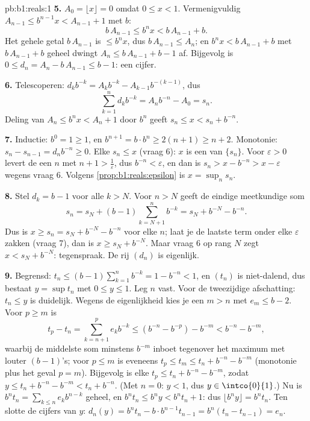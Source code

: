 \begin{solution}{pb:b1:reals:1}
\textbf{5.} $A_0 = \lfloor x \rfloor = 0$ omdat $0 \leq x < 1$.
Vermenigvuldig $A_{n-1} \leq b^{n-1} x < A_{n-1} + 1$ met $b$:
\[
b\,A_{n-1} \leq b^n x < b\,A_{n-1} + b .
\]
Het gehele getal $b\,A_{n-1}$ is $\leq b^n x$, dus $b\,A_{n-1} \leq A_n$;
en $b^n x < b\,A_{n-1} + b$ met $b\,A_{n-1} + b$ geheel dwingt $A_n \leq
b\,A_{n-1} + b - 1$ af. Bijgevolg is $0 \leq d_n = A_n - b\,A_{n-1} \leq
b - 1$: een cijfer.

\textbf{6.} Telescoperen: $d_k b^{-k} = A_k b^{-k} - A_{k-1}
b^{-(k-1)}$, dus
\[
\sum_{k=1}^n d_k b^{-k} = A_n b^{-n} - A_0 = s_n .
\]
Deling van $A_n \leq b^n x < A_n + 1$ door $b^n$ geeft $s_n \leq x < s_n
+ b^{-n}$.

\textbf{7.} Inductie: $b^0 = 1 \geq 1$, en $b^{n+1} = b \cdot b^n \geq
2(n + 1) \geq n + 2$. Monotonie: $s_n - s_{n-1} = d_n b^{-n} \geq 0$.
Elke $s_n \leq x$ (vraag 6): $x$ is een  van $\{s_n\}$. Voor
$\varepsilon > 0$ levert de  een $n$ met $n + 1 >
\frac1\varepsilon$, dus $b^{-n} < \varepsilon$, en dan is $s_n > x -
b^{-n} > x - \varepsilon$ wegens vraag 6. Volgens
\cref{prop:b1:reals:epsilon} is $x = \sup_n s_n$.

\textbf{8.} Stel $d_k = b - 1$ voor alle $k > N$. Voor $n > N$ geeft de
eindige meetkundige som
\[
s_n = s_N + (b - 1)\sum_{k=N+1}^{n} b^{-k}
= s_N + b^{-N} - b^{-n} .
\]
Dus is $x \geq s_n = s_N + b^{-N} - b^{-n}$ voor elke $n$; laat je de
laatste term onder elke $\varepsilon$ zakken (vraag 7), dan is $x \geq
s_N + b^{-N}$. Maar vraag 6 op rang $N$ zegt $x < s_N + b^{-N}$:
tegenspraak. De rij $(d_n)$ is eigenlijk.

\textbf{9.} Begrensd: $t_n \leq (b-1)\sum_{k=1}^n b^{-k} = 1 - b^{-n} <
1$, en $(t_n)$ is niet-dalend, dus bestaat $y = \sup t_n$ met $0 \leq y
\leq 1$. Leg $n$ vast. Voor de tweezijdige afschatting: $t_n \leq y$ is
duidelijk. Wegens de eigenlijkheid kies je een $m > n$ met $e_m \leq b -
2$. Voor $p \geq m$ is
\[
t_p - t_n = \sum_{k=n+1}^{p} e_k b^{-k}
\leq (b^{-n} - b^{-p}) - b^{-m} < b^{-n} - b^{-m},
\]
waarbij de middelste som minstens $b^{-m}$ inboet tegenover het maximum
met louter $(b-1)$'s; voor $p \leq m$ is eveneens $t_p \leq t_m \leq t_n
+ b^{-n} - b^{-m}$ (monotonie plus het geval $p = m$). Bijgevolg is elke
$t_p \leq t_n + b^{-n} - b^{-m}$, zodat $y \leq t_n + b^{-n} - b^{-m} <
t_n + b^{-n}$. (Met $n = 0$: $y < 1$, dus $y \in \intco{0}{1}$.) Nu is
$b^n t_n = \sum_{k \leq n} e_k b^{n-k}$ geheel, en $b^n t_n \leq b^n y <
b^n t_n + 1$: dus $\lfloor b^n y \rfloor = b^n t_n$. Ten slotte de
cijfers van $y$: $d_n(y) = b^n t_n - b \cdot b^{n-1} t_{n-1} = b^n(t_n -
t_{n-1}) = e_n$.


\end{solution}
